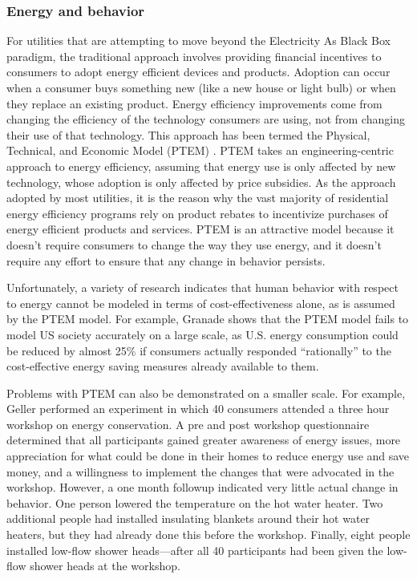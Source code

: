 
\subsubsection{Energy and behavior}

For utilities that are attempting to move beyond the Electricity As Black
Box paradigm, the traditional approach involves providing financial
incentives to consumers to adopt energy efficient devices and products.
Adoption can occur when a consumer buys something new (like a new house or
light bulb) or when they replace an existing product.  Energy efficiency
improvements come from changing the efficiency of the technology consumers
are using, not from changing their use of that technology.  This approach
has been termed the Physical, Technical, and Economic Model (PTEM)
\cite{Lutzenhiser93}.  PTEM takes an engineering-centric approach to energy
efficiency, assuming that energy use is only affected by new technology,
whose adoption is only affected by price subsidies. As the approach adopted
by most utilities, it is the reason why the vast majority of residential
energy efficiency programs rely on product rebates to incentivize purchases
of energy efficient products and services. PTEM is an attractive model
because it doesn't require consumers to change the way they use energy, and
it doesn't require any effort to ensure that any change in behavior
persists.

Unfortunately, a variety of research indicates that human behavior with
respect to energy cannot be modeled in terms of cost-effectiveness alone,
as is assumed by the PTEM model.  For example, Granade \cite{Granade09}
shows that the PTEM model fails to model US society accurately on a large
scale, as U.S. energy consumption could be reduced by almost 25\% if
consumers actually responded ``rationally'' to the cost-effective energy
saving measures already available to them.

Problems with PTEM can also be demonstrated on a smaller scale.  For
example, Geller \cite{Geller81} performed an experiment in which 40
consumers attended a three hour workshop on energy conservation.  A pre and
post workshop questionnaire determined that all participants gained greater
awareness of energy issues, more appreciation for what could be done in
their homes to reduce energy use and save money, and a willingness to
implement the changes that were advocated in the workshop. However, a one
month followup indicated very little actual change in behavior. One person
lowered the temperature on the hot water heater. Two additional people had
installed insulating blankets around their hot water heaters, but they had
already done this before the workshop. Finally, eight people installed
low-flow shower heads---after all 40 participants had been given the
low-flow shower heads at the workshop.

